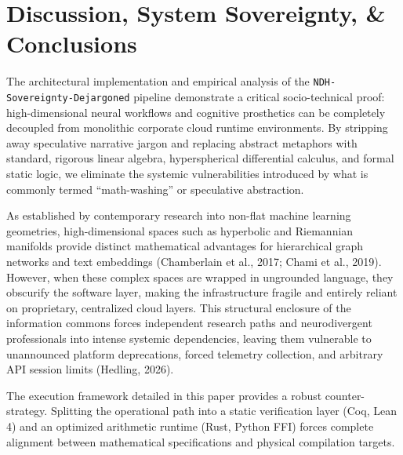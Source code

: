 
\section{Discussion, System Sovereignty, \& Conclusions}

The architectural implementation and empirical analysis of the \texttt{NDH-Sovereignty-Dejargoned} pipeline demonstrate a critical socio-technical proof: high-dimensional neural workflows and cognitive prosthetics can be completely decoupled from monolithic corporate cloud runtime environments. By stripping away speculative narrative jargon and replacing abstract metaphors with standard, rigorous linear algebra, hyperspherical differential calculus, and formal static logic, we eliminate the systemic vulnerabilities introduced by what is commonly termed ``math-washing'' or speculative abstraction.

As established by contemporary research into non-flat machine learning geometries, high-dimensional spaces such as hyperbolic and Riemannian manifolds provide distinct mathematical advantages for hierarchical graph networks and text embeddings (Chamberlain et al., 2017; Chami et al., 2019). However, when these complex spaces are wrapped in ungrounded language, they obscurify the software layer, making the infrastructure fragile and entirely reliant on proprietary, centralized cloud layers. This structural enclosure of the information commons forces independent research paths and neurodivergent professionals into intense systemic dependencies, leaving them vulnerable to unannounced platform deprecations, forced telemetry collection, and arbitrary API session limits (Hedling, 2026).

The execution framework detailed in this paper provides a robust counter-strategy. Splitting the operational path into a static verification layer (Coq, Lean 4) and an optimized arithmetic runtime (Rust, Python FFI) forces complete alignment between mathematical specifications and physical compilation targets. 

